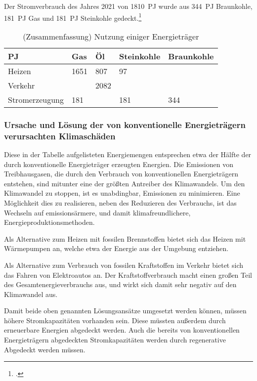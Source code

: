 \documentclass[12pt]{article}
\begin{document}
Der Stromverbrauch des Jahres 2021 von \qty{1810}{PJ} wurde aus \qty{344}{PJ} Braunkohle, \qty{181}{PJ} Gas
und \qty{181}{PJ} Steinkohle gedeckt.\footcite{SMARDEntwicklungenIm}

\begin{table}[!htbp]
    \centering
    \begin{tabular}{l|llll}
        \toprule
        \unit{PJ}      & Gas  & Öl   & Steinkohle & Braunkohle \\
        \midrule
        Heizen         & 1651 & 807  & 97         &            \\
        Verkehr        &      & 2082 &            &            \\
        Stromerzeugung & 181  &      & 181        & 344        \\

        \bottomrule
    \end{tabular}
    \caption{(Zusammenfassung) Nutzung einiger Energieträger}
\end{table}

\subsubsection{Ursache und Lösung der von konventionelle Energieträgern verursachten Klimaschäden}

Diese in der Tabelle aufgelisteten Energiemengen entsprechen etwa der Hälfte
der durch konventionelle Energieträger erzeugten Energien.
Die Emissionen von Treibhausgasen, die durch den Verbrauch von konventionellen Energieträgern
entstehen, sind mitunter eine der größten Antreiber des Klimawandels.
Um den Klimawandel zu stoppen, ist es unabdingbar, Emissionen zu minimieren.
Eine Möglichkeit dies zu realisieren, neben des Reduzieren des Verbrauchs,
ist das Wechseln auf emissionsärmere, und damit klimafreundlichere,
Energieproduktionsmethoden.

Als Alternative zum Heizen mit fossilen Brennstoffen bietet sich
das Heizen mit Wärmepumpen an, welche etwa \unit{} der
Energie aus der Umgebung entziehen.

Als Alternative zum Verbrauch von fossilen Kraftstoffen im Verkehr bietet
sich das Fahren von Elektroautos an. Der Kraftstoffverbrauch macht einen
großen Teil des Gesamtenergieverbrauchs aus, und wirkt sich damit sehr
negativ auf den Klimawandel aus.

Damit beide oben genannten Lösungsansätze umgesetzt werden können, müssen
höhere Stromkapazitäten vorhanden sein. Diese müssten außerdem durch erneuerbare
Energien abgedeckt werden. Auch die bereits von konventionellen Energieträgern
abgedeckten Stromkapazitäten werden durch regenerative Abgedeckt werden müssen.
\end{document}
